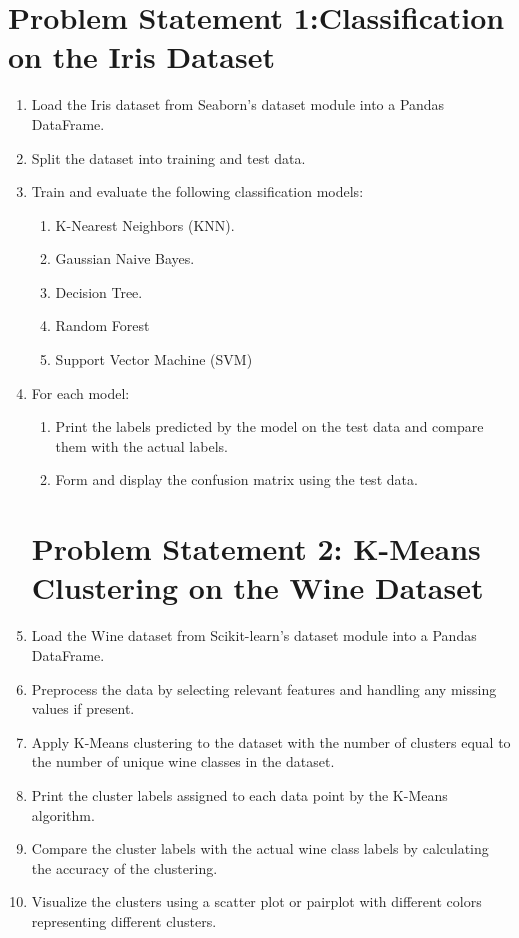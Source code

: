 \usepackage{graphicx}


\section*{Problem Statement 1:Classification on the Iris Dataset}



\begin{enumerate}
    \item  Load the Iris dataset from Seaborn’s dataset module into a Pandas DataFrame.
    \item Split the dataset into training and test data.
    \item Train and evaluate the following classification models:
        \begin{enumerate}
        \item  K-Nearest Neighbors (KNN).
        \item Gaussian Naive Bayes.
        \item Decision Tree.
        \item Random Forest
        \item Support Vector Machine (SVM)
       \end{enumerate}
    \item For each model:
     \begin{enumerate}
        \item  Print the labels predicted by the model on the test data and compare them with
the actual labels.
        \item Form and display the confusion matrix using the test data.
       
    \end{enumerate}
    \section*{Problem Statement 2: K-Means Clustering on the Wine Dataset}



    \item  Load the Wine dataset from Scikit-learn’s dataset module into a Pandas DataFrame.
    \item Preprocess the data by selecting relevant features and handling any missing values
if present.
    \item Apply K-Means clustering to the dataset with the number of clusters equal to the
number of unique wine classes in the dataset.
    \item Print the cluster labels assigned to each data point by the K-Means algorithm.
    \item Compare the cluster labels with the actual wine class labels by calculating the accuracy of the clustering.
    \item Visualize the clusters using a scatter plot or pairplot with different colors representing different clusters.

\end{enumerate}
